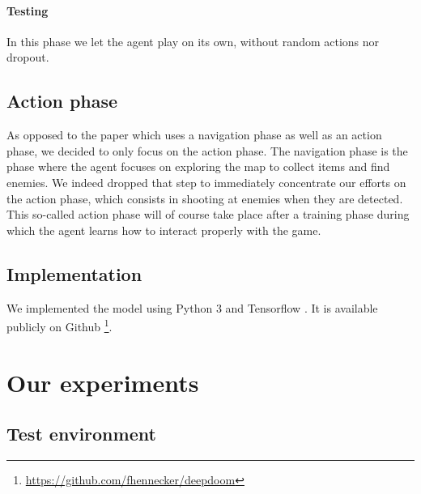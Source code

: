 \documentclass[letterpaper]{article}
\begin{document}
\paragraph{Testing}
In this phase we let the agent play on its own, without random actions nor dropout.

\subsection{Action phase}
As opposed to the paper \citep{Lample2016} which uses a navigation phase as
well as an action phase, we decided to only focus on the action phase. The
navigation phase is the phase where the agent focuses on exploring the map to
collect items and find enemies. We indeed dropped that step to immediately
concentrate our efforts on the action phase, which consists in shooting at
enemies when they are detected. This so-called action phase will of course
take place after a training phase during which the agent learns how to interact
properly with the game.

\subsection{Implementation}
We implemented the model using Python 3 and Tensorflow \citep{tensorflow}.
It is available publicly on Github
\footnote{\url{https://github.com/fhennecker/deepdoom}}.



\section{Our experiments}
%

\subsection{Test environment}
\end{document}
